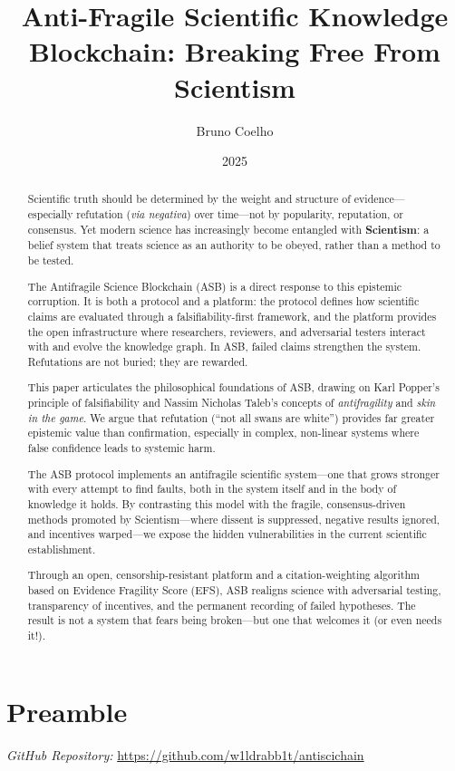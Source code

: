 \documentclass{article}
\title{Anti-Fragile Scientific Knowledge Blockchain: Breaking Free From Scientism}
\author{Bruno Coelho}
\date{2025}
\begin{document}
\maketitle

\begin{abstract}
Scientific truth should be determined by the weight and structure of evidence—especially refutation (\emph{via negativa}) over time—not by popularity, reputation, or consensus. Yet modern science has increasingly become entangled with \textbf{Scientism}: a belief system that treats science as an authority to be obeyed, rather than a method to be tested.

The Antifragile Science Blockchain (ASB) is a direct response to this epistemic corruption. It is both a protocol and a platform: the protocol defines how scientific claims are evaluated through a falsifiability-first framework, and the platform provides the open infrastructure where researchers, reviewers, and adversarial testers interact with and evolve the knowledge graph. In ASB, failed claims strengthen the system. Refutations are not buried; they are rewarded.

This paper articulates the philosophical foundations of ASB, drawing on Karl Popper's principle of falsifiability and Nassim Nicholas Taleb's concepts of \emph{antifragility} and \emph{skin in the game}. We argue that refutation (“not all swans are white”) provides far greater epistemic value than confirmation, especially in complex, non-linear systems where false confidence leads to systemic harm.

The ASB protocol implements an antifragile scientific system—one that grows stronger with every attempt to find faults, both in the system itself and in the body of knowledge it holds. By contrasting this model with the fragile, consensus-driven methods promoted by Scientism—where dissent is suppressed, negative results ignored, and incentives warped—we expose the hidden vulnerabilities in the current scientific establishment.

Through an open, censorship-resistant platform and a citation-weighting algorithm based on Evidence Fragility Score (EFS), ASB realigns science with adversarial testing, transparency of incentives, and the permanent recording of failed hypotheses. The result is not a system that fears being broken—but one that welcomes it (or even needs it!).
\end{abstract}

\section*{Preamble}
\textit{GitHub Repository:} \url{https://github.com/w1ldrabb1t/antiscichain}\\
\end{document}
